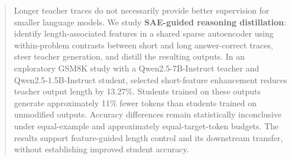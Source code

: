 \begin{abstract}
Longer teacher traces do not necessarily provide better supervision for smaller language models.
We study \textbf{SAE-guided reasoning distillation}: identify length-associated features in a shared sparse autoencoder using within-problem contrasts between short and long answer-correct traces, steer teacher generation, and distill the resulting outputs.
In an exploratory GSM8K study with a Qwen2.5-7B-Instruct teacher and Qwen2.5-1.5B-Instruct student, selected short-feature enhancement reduces teacher output length by 13.27\%.
Students trained on these outputs generate approximately 11\% fewer tokens than students trained on unmodified outputs.
Accuracy differences remain statistically inconclusive under equal-example and approximately equal-target-token budgets.
The results support feature-guided length control and its downstream transfer, without establishing improved student accuracy.
\end{abstract}
